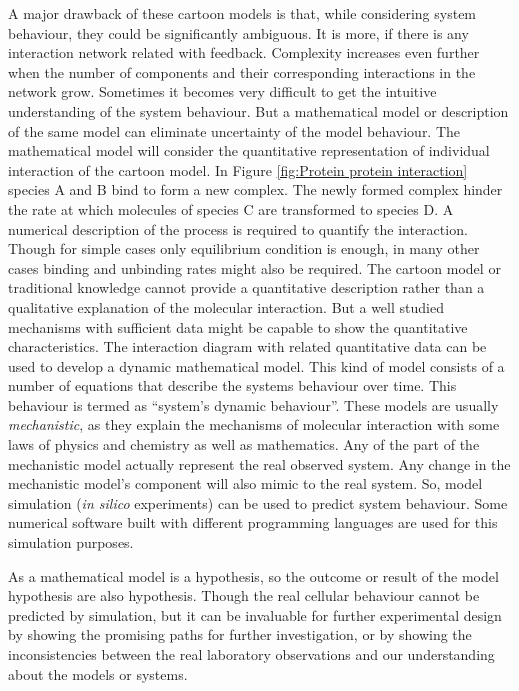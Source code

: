 A major drawback of these cartoon models is that, while considering system behaviour, they could be significantly ambiguous. It is more, if there is any interaction network related with feedback. Complexity increases even further when the number of components and their corresponding interactions in the network grow. Sometimes it becomes very difficult to get the intuitive understanding of the system behaviour. But a mathematical model or description of the same model can eliminate uncertainty of the model behaviour. The mathematical model will consider the quantitative representation of individual interaction of the cartoon model. In Figure \ref{fig:Protein protein interaction} species A and B bind to form a new complex. The newly formed complex hinder the rate at which molecules of species C are transformed to species D. A numerical description of the process is required to quantify the interaction. Though for simple cases only equilibrium condition is enough, in many other cases binding and unbinding rates might also be required. The cartoon model or traditional knowledge cannot provide a quantitative description rather than a qualitative explanation of the molecular interaction. But a well studied mechanisms with sufficient data might be capable to show the quantitative characteristics. The interaction diagram with related quantitative data can be used to develop a dynamic mathematical model. This kind of model consists of a number of equations that describe the systems behaviour over time. This behaviour is termed as ``system's dynamic behaviour''. These models are usually \textit{mechanistic}, as they explain the mechanisms of molecular interaction with some laws of physics and chemistry as well as mathematics. Any of the part of the mechanistic model actually represent the real observed system. Any change in the mechanistic model's component will also mimic to the real system. So, model simulation (\textit{in silico} experiments) can be used to predict system behaviour. Some numerical software built with different programming languages are used for this simulation purposes. 

As a mathematical model is a hypothesis, so the outcome or result of the model hypothesis are also hypothesis. Though the real cellular behaviour cannot be predicted by simulation, but it can be invaluable for further experimental design by showing the promising paths for further investigation, or by showing the inconsistencies between the real laboratory observations and our understanding about the models or systems. 

